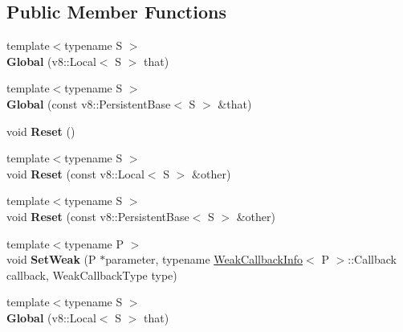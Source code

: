 \subsection*{Public Member Functions}
\begin{DoxyCompactItemize}
\item 
\mbox{\label{class_global_a960d42800206b3e533963b175b2da422}} 
{\footnotesize template$<$typename S $>$ }\\{\bfseries Global} (v8\+::\+Local$<$ S $>$ that)
\item 
\mbox{\label{class_global_ae383e18d6433d2e4b69dea0f073b86b6}} 
{\footnotesize template$<$typename S $>$ }\\{\bfseries Global} (const v8\+::\+Persistent\+Base$<$ S $>$ \&that)
\item 
\mbox{\label{class_global_a86853f85b1d7e18f06c1a1b7f34e34c3}} 
void {\bfseries Reset} ()
\item 
\mbox{\label{class_global_a6df7a28a97bdfb3e67c0cd57dd040f7d}} 
{\footnotesize template$<$typename S $>$ }\\void {\bfseries Reset} (const v8\+::\+Local$<$ S $>$ \&other)
\item 
\mbox{\label{class_global_aecc8701ae7bc41abc09bfcb2e62d453b}} 
{\footnotesize template$<$typename S $>$ }\\void {\bfseries Reset} (const v8\+::\+Persistent\+Base$<$ S $>$ \&other)
\item 
\mbox{\label{class_global_a11e2730ddeabbc1a29affb3194981037}} 
{\footnotesize template$<$typename P $>$ }\\void {\bfseries Set\+Weak} (P $\ast$parameter, typename \hyperlink{class_weak_callback_info}{Weak\+Callback\+Info}$<$ P $>$\+::Callback callback, Weak\+Callback\+Type type)
\item 
\mbox{\label{class_global_a960d42800206b3e533963b175b2da422}} 
{\footnotesize template$<$typename S $>$ }\\{\bfseries Global} (v8\+::\+Local$<$ S $>$ that)
\item 
\mbox{\label{class_global_ac7aa129d5261dc7c72b95004c70ee277}} 

\end{DoxyCompactItemize}
